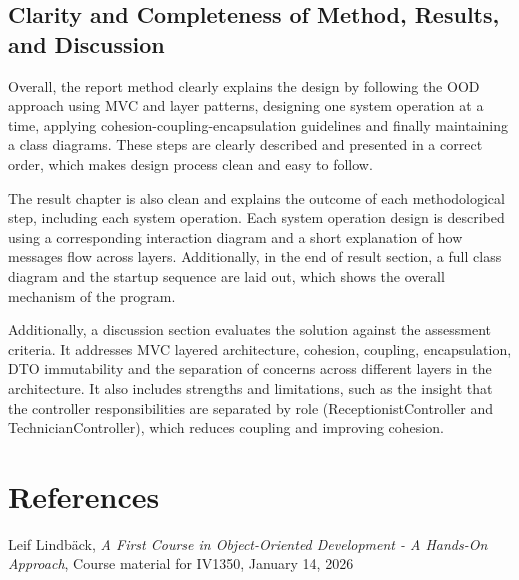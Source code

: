 \documentclass[a4paper]{scrartcl}
\begin{document}
\subsection{Clarity and Completeness of Method, Results, and Discussion}

Overall, the report method clearly explains the design by following the OOD approach using MVC and layer patterns, designing one system operation at a time, applying cohesion-coupling-encapsulation guidelines and finally maintaining a class diagrams. These steps are clearly described and presented in a correct order, which makes design process clean and easy to follow.

The result chapter is also clean and explains the outcome of each methodological step, including each system operation. Each system operation design is described using a corresponding interaction diagram and a short explanation of how messages flow across layers. Additionally, in the end of result section, a full class diagram and the startup sequence are laid out, which shows the overall mechanism of the program. 

Additionally, a discussion section evaluates the solution against the assessment criteria. It addresses MVC layered architecture, cohesion, coupling, encapsulation, DTO immutability and the separation of concerns across different layers in the architecture. It also includes strengths and limitations, such as the insight that the controller responsibilities are separated by role (ReceptionistController and TechnicianController), which reduces coupling and improving cohesion.

\section*{References}


Leif Lindbäck, \textit{A First Course in Object-Oriented Development - A Hands-On Approach}, Course material for IV1350, January 14, 2026
\end{document}
